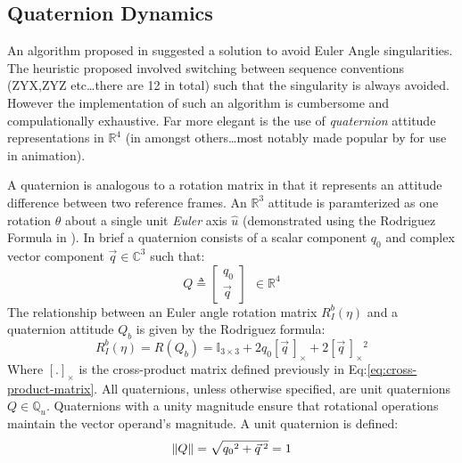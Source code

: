 \subsection{Quaternion Dynamics}
\label{subsec:dynamics.rigidbody.quaternion}
An algorithm proposed in \cite{euleranglesingularity} suggested a solution to avoid Euler Angle singularities. The heuristic proposed involved switching between sequence conventions (ZYX,ZYZ etc\ldots there are 12 in total) such that the singularity is always avoided. However the implementation of such an algorithm is cumbersome and compulationally exhaustive. Far more elegant is the use of \emph{quaternion} attitude representations in $\mathbb{R}^4$ (in \cite{rotationsequences,quaterniondynamics,spacecraftattitutdequaternions} amongst others\ldots most notably made popular by \cite{shoemake} for use in animation).
\par
A quaternion is analogous to a rotation matrix in that it represents an attitude difference between two reference frames. An $\mathbb{R}^3$ attitude is paramterized as one rotation $\theta$ about a single unit \emph{Euler} axis $\hat{u}$ (demonstrated using the Rodriguez Formula in \cite{unwinding}). In brief a quaternion consists of a scalar component $q_0$ and complex vector component $\vec{q}\in \mathbb{C}^3$ such that:
\begin{equation}
Q\triangleq 
\begin{bmatrix}
q_0 \\
\vec{q}
\end{bmatrix}
~~\in\mathbb{R}^4
\end{equation}
The relationship between an Euler angle rotation matrix $R_I^b(\eta)$ and a quaternion attitude $Q_b$ is given by the Rodriguez formula:
\begin{equation}\label{eq:rodriguez}
R_I^b(\eta)=R(Q_b)=\mathbb{I}_{3\times 3}+2q_0[\vec{q}\hspace{2pt}]_\times+2[\vec{q}\hspace{2pt}]_\times\text{}^2
\end{equation}
Where $[.]_\times$ is the cross-product matrix defined previously in Eq:\ref{eq:cross-product-matrix}. All quaternions, unless otherwise specified, are unit quaternions $Q\in\mathbb{Q}_u$. Quaternions with a unity magnitude ensure that rotational operations maintain the vector operand's magnitude. A unit quaternion is defined:
\begin{equation}
\left\lVert Q\right\rVert=\sqrt{{q_0}^2+\vec{q}\text{}\hspace{2pt}^2}=1
\end{equation}
